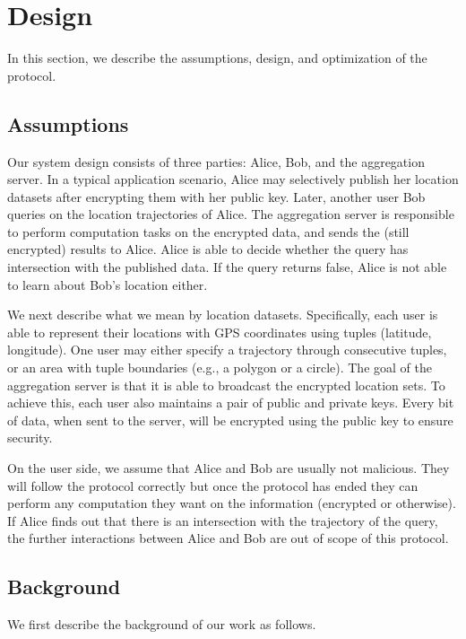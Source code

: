 \section{Design}
\label{sec:design}

In this section, we describe the assumptions, design, and optimization of the protocol.

\subsection{Assumptions}

Our system design consists of three parties: Alice, Bob, and the aggregation server. In a typical application scenario, Alice may selectively publish her location datasets after encrypting them with her public key. Later, another user Bob queries on the location trajectories of Alice. The aggregation server is responsible to perform computation tasks on the encrypted data, and sends the (still encrypted) results to Alice. Alice is able to decide whether the query has intersection with the published data. If the query returns false, Alice is not able to learn about Bob’s location either.

We next describe what we mean by location datasets. Specifically, each user is able to represent their locations with GPS coordinates using tuples (latitude, longitude). One user may either specify a trajectory through consecutive tuples, or an area with tuple boundaries (e.g., a polygon or a circle). The goal of the aggregation server is that it is able to broadcast the encrypted location sets. To achieve this, each user also maintains a pair of public and private keys. Every bit of data, when sent to the server, will be encrypted using the public key to ensure security.

On the user side, we assume that Alice and Bob are usually not malicious. They will follow the protocol correctly but once the protocol has ended they can perform any computation they want on the information (encrypted or otherwise). If Alice finds out that there is an intersection with the trajectory of the query, the further interactions between Alice and Bob are out of scope of this protocol.


\subsection{Background}

We first describe the background of our work as follows.

